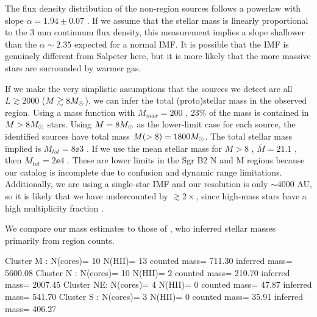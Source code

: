 \documentclass{emulateapj}
\newcommand{\ncores}{138\xspace}
\begin{document}
The flux density distribution of the non-\hii region sources follows a powerlaw
with slope $\alpha=1.94\pm0.07$ \citep[fitted with the MLE method
of][]{Clauset2007a}.  If we assume that the stellar mass is linearly
proportional to the 3 mm continuum flux density, this measurement implies a
slope shallower than the $\alpha\sim2.35$ expected for a normal IMF.  It is
possible that the IMF is genuinely different from Salpeter here, but it is more
likely that the more massive stars are surrounded by warmer gas.

If we make the very simplistic assumptions that the sources we detect are all
$L\gtrsim2000$ \lsun ($M\gtrsim8 M_{\odot}$), 
we can infer the total (proto)stellar mass in the observed region.
Using a \citet{Kroupa2001a} mass function with $M_{max}=200$ \msun, 23\% of
the mass is contained in $M>8M_{\odot}$ stars.  Using $M=8M_{\odot}$ as the lower-limit
case for each source, the identified sources have total mass $M(>8)=1800M_{\odot}$.
The total stellar mass implied is $M_{tot} = 8\ee{3}$ \msun.  If we use the
mean stellar mass for $M>8$ \msun, $\bar{M}=21.1$ \msun, then $M_{tot}=2\ee{4}$
\msun.  These are lower limits in the Sgr B2 N and M regions because our
catalog is incomplete due to confusion and dynamic range limitations.
Additionally, we are using a single-star IMF and our resolution is only $\sim4000$
AU, so it is likely that we have undercounted by $\gtrsim2\times$, since high-mass
stars have a high multiplicity fraction \citep{Mason2009a}.


We compare our mass estimates to those of \citet{Schmiedeke2016a}, who inferred
stellar masses primarily from \hii region counts.

Cluster M : N(cores)= 10 N(HII)= 13 counted mass=    711.30 inferred mass=   5600.08
Cluster N : N(cores)= 10 N(HII)=  2 counted mass=    210.70 inferred mass=   2007.45
Cluster NE: N(cores)=  4 N(HII)=  0 counted mass=     47.87 inferred mass=    541.70
Cluster S : N(cores)=  3 N(HII)=  0 counted mass=     35.91 inferred mass=    406.27



% 
\end{document}
